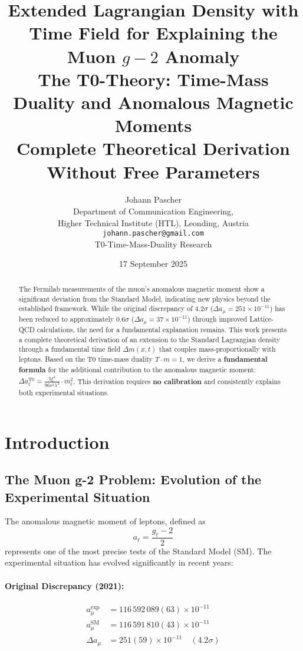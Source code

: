 \documentclass[12pt,a4paper]{article}
\title{\textbf{Extended Lagrangian Density with Time Field for Explaining the Muon \(g-2\) Anomaly}\\[0.5cm]
	\large The T0-Theory: Time-Mass Duality and Anomalous Magnetic Moments\\[0.3cm]
	\normalsize Complete Theoretical Derivation Without Free Parameters}
\author{Johann Pascher\\
	\small Department of Communication Engineering,\\
	\small Higher Technical Institute (HTL), Leonding, Austria\\
	\small \texttt{johann.pascher@gmail.com}\\
	\small T0-Time-Mass-Duality Research}
\date{17 September 2025}
\theoremstyle{definition}
\begin{document}
	\maketitle
	\thispagestyle{fancy}
	
	\begin{abstract}
		The Fermilab measurements of the muon's anomalous magnetic moment show a significant deviation from the Standard Model, indicating new physics beyond the established framework. While the original discrepancy of $4.2\sigma$ ($\Delta a_\mu = 251 \times 10^{-11}$) has been reduced to approximately $0.6\sigma$ ($\Delta a_\mu = 37 \times 10^{-11}$) through improved Lattice-QCD calculations, the need for a fundamental explanation remains. This work presents a complete theoretical derivation of an extension to the Standard Lagrangian density through a fundamental time field $\Delta m(x,t)$ that couples mass-proportionally with leptons. Based on the T0 time-mass duality $T \cdot m = 1$, we derive a \textbf{fundamental formula} for the additional contribution to the anomalous magnetic moment: $\Delta a_\ell^{\text{T0}} = \frac{5\xi^4}{96\pi^2\lambda^2} \cdot m_\ell^2$. This derivation requires \textbf{no calibration} and consistently explains both experimental situations.
	\end{abstract}
	
	\section{Introduction}
	
	\subsection{The Muon g-2 Problem: Evolution of the Experimental Situation}
	
	The anomalous magnetic moment of leptons, defined as
	\begin{equation}
		a_\ell = \frac{g_\ell - 2}{2}
	\end{equation}
	represents one of the most precise tests of the Standard Model (SM). The experimental situation has evolved significantly in recent years:
	
	\paragraph{Original Discrepancy (2021):}
	\begin{align}
		a_\mu^{\text{exp}} &= 116\,592\,089(63) \times 10^{-11}\\
		a_\mu^{\text{SM}} &= 116\,591\,810(43) \times 10^{-11}\\
		\Delta a_\mu &= 251(59) \times 10^{-11} \quad (4.2\sigma) \label{eq:old_discrepancy}
	\end{align}
	
\end{document}
